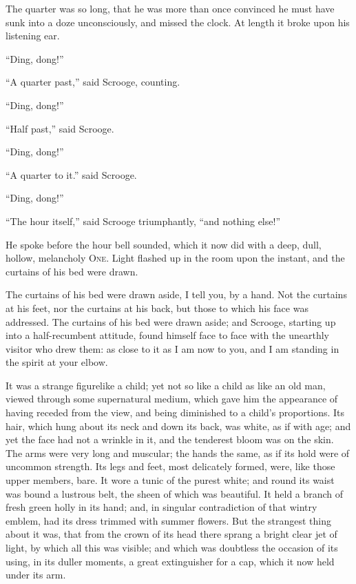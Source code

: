 \documentclass[paper=5.5in:8.5in,BCOR=5mm,twoside,DIV=calc,12pt,usegeometry]{scrbook} %
\begin{document}
The quarter was so long, that he was more than once convinced he must have sunk into a doze unconsciously, and missed the clock. At length it broke upon his listening ear.

\enquote{Ding, dong!}

\enquote{A quarter past,} said Scrooge, counting.

\enquote{Ding, dong!}

\enquote{Half past,} said Scrooge.

\enquote{Ding, dong!}

\enquote{A quarter to it.} said Scrooge.

\enquote{Ding, dong!}

\enquote{The hour itself,} said Scrooge triumphantly, \enquote{and nothing else!}

He spoke before the hour bell sounded, which it now did with a deep, dull, hollow, melancholy \textsc{One}. Light flashed up in the room upon the instant, and the curtains of his bed were drawn.

The curtains of his bed were drawn aside, I tell you, by a hand. Not the curtains at his feet, nor the curtains at his back, but those to which his face was addressed. The curtains of his bed were drawn aside; and Scrooge, starting up into a half-recumbent attitude, found himself face to face with the unearthly visitor who drew them: as close to it as I am now to you, and I am standing in the spirit at your elbow.

It was a strange figure\textemdash like a child; yet not so like a child as like an old man, viewed through some supernatural medium, which gave him the appearance of having receded from the view, and being diminished to a child's proportions. Its hair, which hung about its neck and down its back, was white, as if with age; and yet the face had not a wrinkle in it, and the tenderest bloom was on the skin. The arms were very long and muscular; the hands the same, as if its hold were of uncommon strength. Its legs and feet, most delicately formed, were, like those upper members, bare. It wore a tunic of the purest white; and round its waist was bound a lustrous belt, the sheen of which was beautiful. It held a branch of fresh green holly in its hand; and, in singular contradiction of that wintry emblem, had its dress trimmed with summer flowers. But the strangest thing about it was, that from the crown of its head there sprang a bright clear jet of light, by which all this was visible; and which was doubtless the occasion of its using, in its duller moments, a great extinguisher for a cap, which it now held under its arm.
\end{document}
